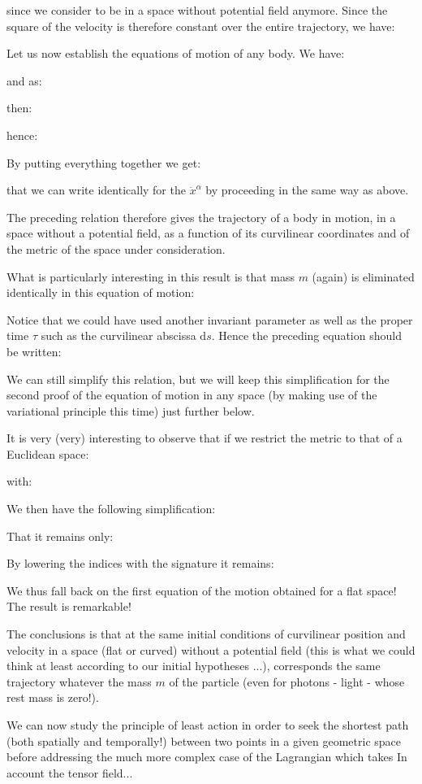 	since we consider to be in a space without potential field anymore. Since the square of the velocity is therefore constant over the entire trajectory, we have:
	
	Let us now establish the equations of motion of any body. We have:
	
	and as:
	
	then:
	
	hence:
	
	By putting everything together we get:
	
	that we can write identically for the $\ddot{x}^\alpha$ by proceeding in the same way as above.

	The preceding relation therefore gives the trajectory of a body in motion, in a space without a potential field, as a function of its curvilinear coordinates and of the metric of the space under consideration.

	What is particularly interesting in this result is that mass $m$ (again) is eliminated identically in this equation of motion:
	
	Notice that we could have used another invariant parameter as well as the proper time $\tau$ such as the curvilinear abscissa $\mathrm{d}s$. Hence the preceding equation should be written:
	
	We can still simplify this relation, but we will keep this simplification for the second proof of the equation of motion in any space (by making use of the variational principle this time) just further below.

	It is very (very) interesting to observe that if we restrict the metric to that of a Euclidean space:
	
	with:
	
	We then have the following simplification:
	
	That it remains only:
	
	By lowering the indices with the signature it remains:
	
	We thus fall back on the first equation of the motion obtained for a flat space! The result is remarkable!

	The conclusions is that at the same initial conditions of curvilinear position and velocity in a space (flat or curved) without a potential field (this is what we could think at least according to our initial hypotheses ...), corresponds the same trajectory whatever the mass $m$ of the particle (even for photons - light - whose rest mass is zero!).

	We can now study the principle of least action in order to seek the shortest path (both spatially and temporally!) between two points in a given geometric space before addressing the much more complex case of the Lagrangian which takes In account the tensor field...
	
